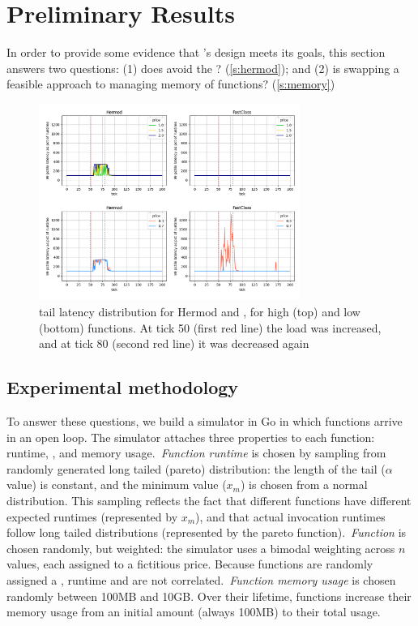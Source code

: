 \section{Preliminary Results}
\label{s:eval}

In order to provide some evidence that \sys{}'s design meets its goals,
this section answers two questions: (1) does \sys{} avoid the \problem?
(\autoref{s:hermod}); and (2) is swapping a feasible approach to
managing memory of functions? (\autoref{s:memory})

\begin{figure}[t!]
    \centering
      \includegraphics[width=8.5cm]{img/hermod_xx_latencies.png}
      \caption{ tail latency distribution for Hermod and \sys{}, for high (top)
      and low (bottom) \priceclass{} functions. At tick 50 (first red line) the
      load was increased, and at tick 80 (second red line) it was decreased again
      }
    \label{fig:hermod-xx-latencies}
\end{figure}


\subsection{Experimental methodology}

To answer these questions, we build a simulator in Go\cite{golang} in
which functions arrive in an open loop. The simulator attaches three
properties to each function: runtime, \priceclass{}, and memory
usage.~\textit{Function runtime} is chosen by sampling from randomly
generated long tailed (pareto) distribution: the length of the tail
($\alpha$ value) is constant, and the minimum value ($x_m$) is chosen
from a normal distribution. This sampling reflects the fact that
different functions have different expected runtimes (represented by
$x_m$), and that actual invocation runtimes follow long tailed
distributions (represented by the pareto function).~\textit{Function
  \class{}} is chosen randomly, but weighted: the simulator uses a
bimodal weighting across $n$ \priceclass{} values, each assigned to a
fictitious price. Because functions are randomly assigned a \class{},
runtime and \class{} are not correlated.~\textit{Function memory
  usage} is chosen randomly between 100MB and 10GB. Over their
lifetime, functions increase their memory usage from an initial amount
(always 100MB) to their total usage.

